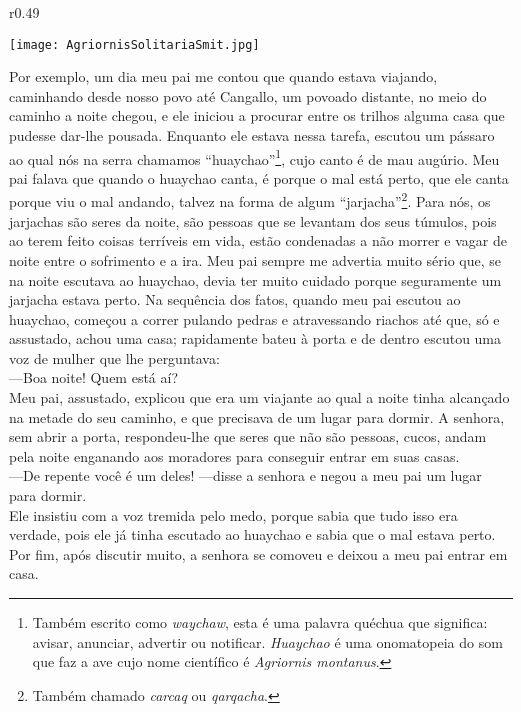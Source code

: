 \ifdefined\EnableIncludeImages
\begin{wrapfigure}{r}{0.49\textwidth}
  \begin{center}
  \vspace{-20pt}
    \texttt{[image: AgriornisSolitariaSmit.jpg]}
  \end{center}
  \vspace{-20pt}
\end{wrapfigure}
\fi
Por exemplo, um dia meu pai me contou que quando estava viajando, caminhando desde nosso povo até Cangallo, um povoado distante, no meio do caminho a noite chegou, e ele iniciou a procurar entre os trilhos alguma casa que pudesse dar-lhe pousada. 
Enquanto ele estava nessa tarefa, escutou um pássaro ao qual nós na serra chamamos ``huaychao''\footnote{Também escrito como \textit{waychaw}, esta é uma palavra quéchua que significa: avisar, anunciar, advertir ou notificar. \textit{Huaychao} é uma onomatopeia do som que faz a ave cujo nome científico é \textit{Agriornis montanus}.}, cujo canto é de mau augúrio.
Meu pai falava que quando o huaychao canta, é porque o mal está perto, que ele canta porque viu o mal andando, talvez na forma de algum ``jarjacha''\footnote{Também chamado \textit{carcaq} ou \textit{qarqacha}.}. 
Para nós, os jarjachas são seres da noite, são pessoas que se levantam dos seus túmulos, pois ao terem feito coisas terríveis em vida, estão condenadas a não morrer e vagar de noite entre o sofrimento e a ira. 
Meu pai sempre me advertia muito sério que, se na noite escutava ao huaychao, devia ter muito cuidado porque seguramente um jarjacha estava perto. 
Na sequência dos fatos, quando meu pai escutou ao huaychao, começou a correr pulando pedras e atravessando riachos até que, só e assustado, achou uma casa; rapidamente bateu à porta e de dentro escutou uma voz de mulher que lhe perguntava:\\\indent
---Boa noite! Quem está aí?\\\indent
Meu pai, assustado, explicou que era um viajante ao qual a noite tinha alcançado na metade do seu caminho, e que precisava de um lugar para dormir. 
A senhora, sem abrir a porta, respondeu-lhe que seres que não são pessoas, cucos, andam pela noite enganando aos moradores para conseguir entrar em suas casas.\\\indent
---De repente você é um deles! ---disse a senhora e negou a meu pai um lugar para dormir.\\\indent
Ele insistiu com a voz tremida pelo medo, porque sabia que tudo isso era verdade, pois ele já tinha escutado ao huaychao e sabia que o mal estava perto. Por fim, após discutir muito, a senhora se comoveu e deixou a meu pai entrar em casa. 
